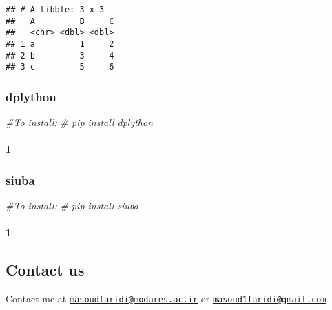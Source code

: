 \documentclass[
]{article}
\newenvironment{Shaded}{\begin{snugshade}}{\end{snugshade}}
\newcommand{\CommentTok}[1]{\textcolor[rgb]{0.56,0.35,0.01}{\textit{#1}}}
\begin{document}
\begin{verbatim}
## # A tibble: 3 x 3
##   A         B     C
##   <chr> <dbl> <dbl>
## 1 a         1     2
## 2 b         3     4
## 3 c         5     6
\end{verbatim}

\hypertarget{dplython}{%
\subsubsection{dplython}\label{dplython}}

\begin{Shaded}
\begin{Highlighting}[]
\CommentTok{\#To install:}
\CommentTok{\# pip install dplython}
\end{Highlighting}
\end{Shaded}

\hypertarget{section}{%
\paragraph{\texorpdfstring{{ 1 }}{ 1 }}\label{section}}

\hypertarget{siuba}{%
\subsubsection{siuba}\label{siuba}}

\begin{Shaded}
\begin{Highlighting}[]
\CommentTok{\#To install:}
\CommentTok{\# pip install siuba}
\end{Highlighting}
\end{Shaded}

\hypertarget{section-1}{%
\paragraph{\texorpdfstring{{ 1 }}{ 1 }}\label{section-1}}

\hypertarget{contact-us}{%
\subsection{Contact us}\label{contact-us}}

Contact me at
\href{mailto:masoudfaridi@modares.ac.ir}{\nolinkurl{masoudfaridi@modares.ac.ir}}
or
\href{mailto:masoud1faridi@gmail.com}{\nolinkurl{masoud1faridi@gmail.com}}
\end{document}
